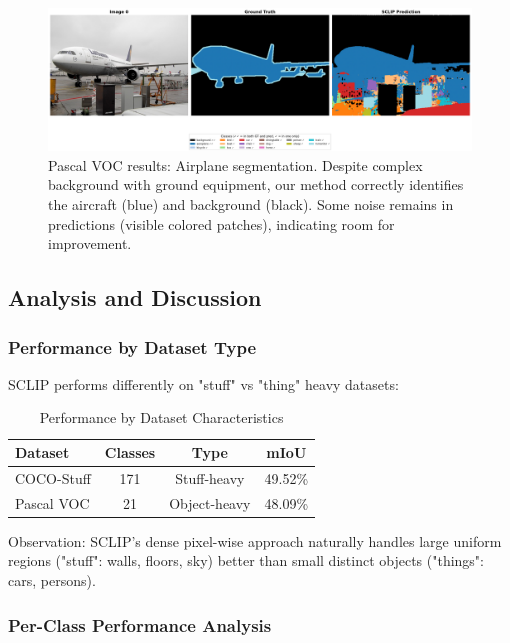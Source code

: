 \begin{figure}[h]
\centering
\includegraphics[width=\textwidth]{Imagenes/sclip_voc_sample0.png}
\caption{Pascal VOC results: Airplane segmentation. Despite complex background with ground equipment, our method correctly identifies the aircraft (blue) and background (black). Some noise remains in predictions (visible colored patches), indicating room for improvement.}
\label{fig:sclip_voc_results}
\end{figure}

\subsection{Analysis and Discussion}

\subsubsection{Performance by Dataset Type}

SCLIP performs differently on "stuff" vs "thing" heavy datasets:

\begin{table}[h]
\centering
\caption{Performance by Dataset Characteristics}
\label{tab:dataset_analysis}
\begin{tabular}{lccc}
\hline
\textbf{Dataset} & \textbf{Classes} & \textbf{Type} & \textbf{mIoU} \\
\hline
COCO-Stuff & 171 & Stuff-heavy & 49.52\% \\
Pascal VOC & 21 & Object-heavy & 48.09\% \\
\hline
\end{tabular}
\end{table}

Observation: SCLIP's dense pixel-wise approach naturally handles large uniform regions ("stuff": walls, floors, sky) better than small distinct objects ("things": cars, persons).

\subsubsection{Per-Class Performance Analysis}


